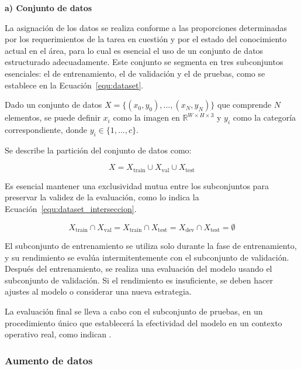 \textbf{a) Conjunto de datos}

La asignación de los datos se realiza conforme a las proporciones determinadas por los requerimientos de la tarea en cuestión y por el estado del conocimiento actual en el área, para lo cual es esencial el uso de un conjunto de datos estructurado adecuadamente. Este conjunto se segmenta en tres subconjuntos esenciales: el de entrenamiento, el de validación y el de pruebas, como se establece en la Ecuación~\ref{equ:dataset}.

Dado un conjunto de datos \( X = \{(x_{0},y_{0}), ..., (x_{N},y_{N})\} \) que comprende \( N \) elementos, se puede definir \( x_{i} \) como la imagen en \( \mathbb{R}^{W \times H \times 3} \) y \( y_{i} \) como la categoría correspondiente, donde \( y_{i} \in \{1, ..., c\} \).

Se describe la partición del conjunto de datos como:

\begin{equation}
    \label{equ:dataset}
    X = X_{\text{train}} \cup X_{\text{val}} \cup X_{\text{test}}
\end{equation}

Es esencial mantener una exclusividad mutua entre los subconjuntos para preservar la validez de la evaluación, como lo indica la Ecuación~\ref{equ:dataset_interseccion}.

\begin{equation}
    \label{equ:dataset_interseccion}
    X_{\text{train}} \cap X_{\text{val}} = X_{\text{train}} \cap X_{\text{test}} = X_{\text{dev}} \cap X_{\text{test}} = \emptyset
\end{equation}

El subconjunto de entrenamiento se utiliza solo durante la fase de entrenamiento, y su rendimiento se evalúa intermitentemente con el subconjunto de validación. Después del entrenamiento, se realiza una evaluación del modelo usando el subconjunto de validación. Si el rendimiento es insuficiente, se deben hacer ajustes al modelo o considerar una nueva estrategia.

La evaluación final se lleva a cabo con el subconjunto de pruebas, en un procedimiento único que establecerá la efectividad del modelo en un contexto operativo real, como indican .

\subsubsection{Aumento de datos}

